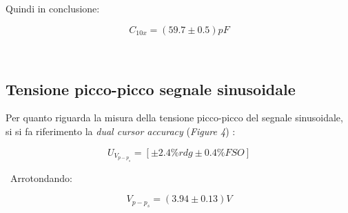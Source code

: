 \documentclass[a4paper]{article}
\begin{document}
Quindi in conclusione:
\begin{Large}
	\begin{equation}
		{C_{10x}}=( 59.7 \pm0.5) pF
	\end{equation}
\end{Large}\\

\subsection{Tensione picco-picco segnale sinusoidale} 
Per quanto riguarda la misura della tensione picco-picco del segnale sinusoidale, si si fa riferimento la \emph{dual cursor accuracy} (\emph{Figure 4}) :

\begin{Large}
	\begin{equation}
		U_{V_{p-p_{s}}}= [\pm 2.4\% rdg\pm 0.4\%FSO]
	\end{equation}
\end{Large}\
Arrotondando:
\begin{Large}
	\begin{equation}
		V_{p-p_{s}}= (3.94\pm 0.13)V
\end{equation}
\end{Large}\\
\end{document}
